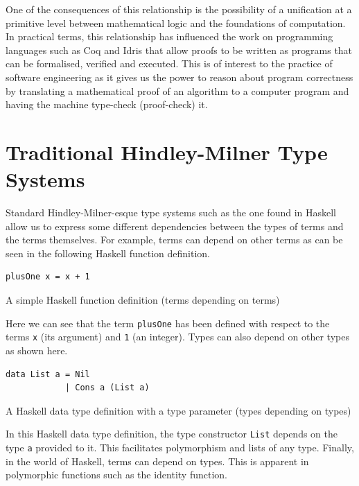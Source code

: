 \documentclass[a4paper, notitlepage]{report}
\begin{document}
One of the consequences of this relationship is the possibility of a unification
at a primitive level between mathematical logic and the foundations of
computation. In practical terms, this relationship has influenced the work on
programming languages such as Coq and Idris that allow proofs to be written as
programs that can be formalised, verified and executed. This is of interest to
the practice of software engineering as it gives us the power to reason about
program correctness by translating a mathematical proof of an algorithm to a
computer program and having the machine type-check (proof-check) it.

\section{Traditional Hindley-Milner Type Systems}
\label{sec:orgdbe3908}
Standard Hindley-Milner-esque type systems such as the one found in Haskell
allow us to express some different dependencies between the types of terms and
the terms themselves. For example, terms can depend on other terms as can be
seen in the following Haskell function definition.

\begin{listing}[H]
\begin{verbatim}
plusOne x = x + 1
\end{verbatim}
\caption{A simple Haskell function definition (terms depending on terms)}
\end{listing}

Here we can see that the term \texttt{plusOne} has been defined with respect to the terms
\texttt{x} (its argument) and \texttt{1} (an integer). Types can also depend on other types as
shown here.

\begin{listing}[H]
\begin{verbatim}
data List a = Nil
            | Cons a (List a)
\end{verbatim}
\caption{A Haskell data type definition with a type parameter (types depending on types)}
\end{listing}

In this Haskell data type definition, the type constructor \texttt{List} depends on the
type \texttt{a} provided to it. This facilitates polymorphism and lists of any type.
Finally, in the world of Haskell, terms can depend on types. This is apparent in
polymorphic functions such as the identity function.
\end{document}
